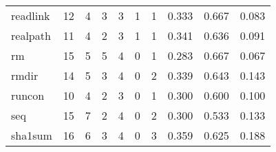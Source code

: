\begin{longtable}{lp{1.3cm}p{1.3cm}p{1.3cm}p{1.3cm}p{1.3cm}p{1.3cm}p{1.3cm}p{1.3cm}p{1.3cm}}
readlink  &                     12 &                                             4 &                                            3 &                                           3 &                                            1 &                                          1 &                                0.333 &                                  0.667 &                                0.083 \\
realpath  &                     11 &                                             4 &                                            2 &                                           3 &                                            1 &                                          1 &                                0.341 &                                  0.636 &                                0.091 \\
rm        &                     15 &                                             5 &                                            5 &                                           4 &                                            0 &                                          1 &                                0.283 &                                  0.667 &                                0.067 \\
rmdir     &                     14 &                                             5 &                                            3 &                                           4 &                                            0 &                                          2 &                                0.339 &                                  0.643 &                                0.143 \\
runcon    &                     10 &                                             4 &                                            2 &                                           3 &                                            0 &                                          1 &                                0.300 &                                  0.600 &                                0.100 \\
seq       &                     15 &                                             7 &                                            2 &                                           4 &                                            0 &                                          2 &                                0.300 &                                  0.533 &                                0.133 \\
sha1sum   &                     16 &                                             6 &                                            3 &                                           4 &                                            0 &                                          3 &                                0.359 &                                  0.625 &                                0.188 \\

\end{longtable}
